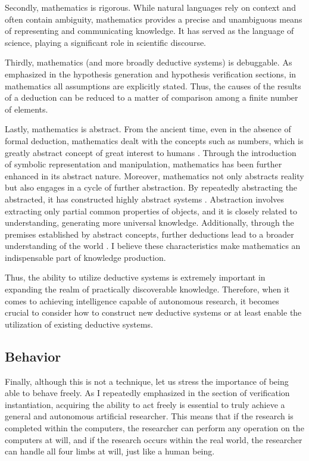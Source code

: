 \documentclass{article}
\begin{document}
Secondly, mathematics is rigorous. While natural languages rely on context and often contain ambiguity, mathematics provides a precise and unambiguous means of representing and communicating knowledge. It has served as the language of science, playing a significant role in scientific discourse.

Thirdly, mathematics (and more broadly deductive systems) is debuggable. As emphasized in the hypothesis generation and hypothesis verification sections, in mathematics all assumptions are explicitly stated. Thus, the causes of the results of a deduction can be reduced to a matter of comparison among a finite number of elements.

Lastly, mathematics is abstract. From the ancient time, even in the absence of formal deduction, mathematics dealt with the concepts such as numbers, which is greatly abstract concept of great interest to humans \cite{david2010history}. Through the introduction of symbolic representation and manipulation, mathematics has been further enhanced in its abstract nature. Moreover, mathematics not only abstracts reality but also engages in a cycle of further abstraction. By repeatedly abstracting the abstracted, it has constructed highly abstract systems \cite{bochner1968role}. Abstraction involves extracting only partial common properties of objects, and it is closely related to understanding, generating more universal knowledge. Additionally, through the premises established by abstract concepts, further deductions lead to a broader understanding of the world \cite{heisenberg2008abstraction}. I believe these characteristics make mathematics an indispensable part of knowledge production. 

Thus, the ability to utilize deductive systems is extremely important in expanding the realm of practically discoverable knowledge. Therefore, when it comes to achieving intelligence capable of autonomous research, it becomes crucial to consider how to construct new deductive systems or at least enable the utilization of existing deductive systems.

\subsection{Behavior}
Finally, although this is not a technique, let us stress the importance of being able to behave freely. As I repeatedly emphasized in the section of verification instantiation, acquiring the ability to act freely is essential to truly achieve a general and autonomous artificial researcher. This means that if the research is completed within the computers, the researcher can perform any operation on the computers at will, and if the research occurs within the real world, the researcher can handle all four limbs at will, just like a human being.
\end{document}
